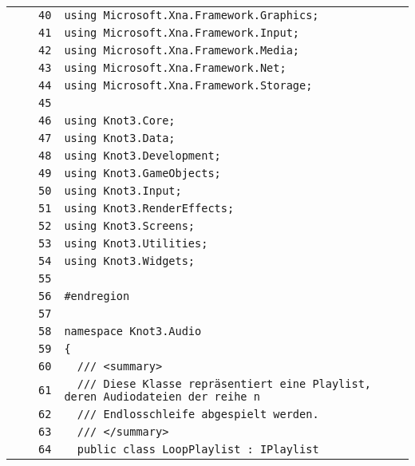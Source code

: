 \documentclass[a4paper,10pt]{article}
\begin{document}
\begin{longtable}[l]{lrrl}
\cellcolor{gray} &  & \verb~40~ & \verb~using Microsoft.Xna.Framework.Graphics;~\\
\cellcolor{gray} &  & \verb~41~ & \verb~using Microsoft.Xna.Framework.Input;~\\
\cellcolor{gray} &  & \verb~42~ & \verb~using Microsoft.Xna.Framework.Media;~\\
\cellcolor{gray} &  & \verb~43~ & \verb~using Microsoft.Xna.Framework.Net;~\\
\cellcolor{gray} &  & \verb~44~ & \verb~using Microsoft.Xna.Framework.Storage;~\\
\cellcolor{gray} &  & \verb~45~ & \verb~~\\
\cellcolor{gray} &  & \verb~46~ & \verb~using Knot3.Core;~\\
\cellcolor{gray} &  & \verb~47~ & \verb~using Knot3.Data;~\\
\cellcolor{gray} &  & \verb~48~ & \verb~using Knot3.Development;~\\
\cellcolor{gray} &  & \verb~49~ & \verb~using Knot3.GameObjects;~\\
\cellcolor{gray} &  & \verb~50~ & \verb~using Knot3.Input;~\\
\cellcolor{gray} &  & \verb~51~ & \verb~using Knot3.RenderEffects;~\\
\cellcolor{gray} &  & \verb~52~ & \verb~using Knot3.Screens;~\\
\cellcolor{gray} &  & \verb~53~ & \verb~using Knot3.Utilities;~\\
\cellcolor{gray} &  & \verb~54~ & \verb~using Knot3.Widgets;~\\
\cellcolor{gray} &  & \verb~55~ & \verb~~\\
\cellcolor{gray} &  & \verb~56~ & \verb~#endregion~\\
\cellcolor{gray} &  & \verb~57~ & \verb~~\\
\cellcolor{gray} &  & \verb~58~ & \verb~namespace Knot3.Audio~\\
\cellcolor{gray} &  & \verb~59~ & \verb~{~\\
\cellcolor{gray} &  & \verb~60~ & \verb~  /// <summary>~\\
\cellcolor{gray} &  & \verb~61~ & \verb~  /// Diese Klasse repräsentiert eine Playlist, deren Audiodateien der reihe n~\\
\cellcolor{gray} &  & \verb~62~ & \verb~  /// Endlosschleife abgespielt werden.~\\
\cellcolor{gray} &  & \verb~63~ & \verb~  /// </summary>~\\
\cellcolor{gray} &  & \verb~64~ & \verb~  public class LoopPlaylist : IPlaylist~\\

\end{longtable}
\end{document}
